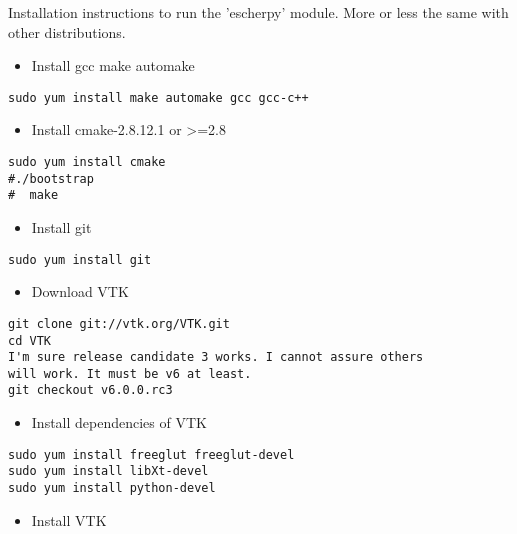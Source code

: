 \documentclass[a4paper]{article}
\begin{document}
Installation instructions to run the 'escherpy' module.
More or less the same with other distributions.
%
\begin{itemize}

\item Install gcc make automake

\end{itemize}
%
\asciilist
\begin{lstlisting}
sudo yum install make automake gcc gcc-c++
\end{lstlisting}
%
\begin{itemize}

\item Install cmake-2.8.12.1 or >=2.8

\end{itemize}
%
\asciilist
\begin{lstlisting}
sudo yum install cmake
#./bootstrap
#  make
\end{lstlisting}
%
\begin{itemize}

\item Install git

\end{itemize}
%
\asciilist
\begin{lstlisting}
sudo yum install git
\end{lstlisting}
%
\begin{itemize}

\item Download VTK

\end{itemize}
%
\asciilist
\begin{lstlisting}
git clone git://vtk.org/VTK.git
cd VTK
I'm sure release candidate 3 works. I cannot assure others
will work. It must be v6 at least.
git checkout v6.0.0.rc3
\end{lstlisting}
%
\begin{itemize}

\item Install dependencies of VTK

\end{itemize}
%
\asciilist
\begin{lstlisting}
sudo yum install freeglut freeglut-devel
sudo yum install libXt-devel
sudo yum install python-devel
\end{lstlisting}
%
\begin{itemize}

\item Install VTK

\end{itemize}
\end{document}
